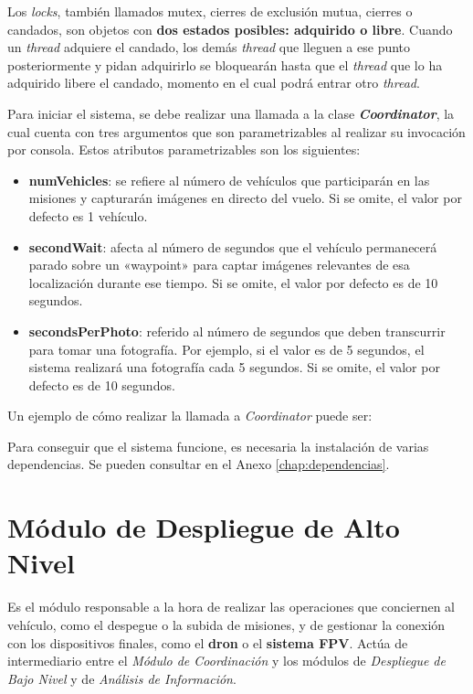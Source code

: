 Los \textit{locks}, también llamados mutex, cierres de exclusión mutua, cierres o candados, son objetos con \textbf{dos estados posibles: adquirido o libre}. Cuando un \textit{thread} adquiere el candado, los demás \textit{thread} que lleguen a ese punto posteriormente y pidan adquirirlo se bloquearán hasta que el \textit{thread} que lo ha adquirido libere el candado, momento en el cual podrá entrar otro \textit{thread}.

Para iniciar el sistema, se debe realizar una llamada a la clase \textbf{\textit{Coordinator}}, la cual cuenta con tres argumentos que son parametrizables al realizar su invocación por consola. Estos atributos parametrizables son los siguientes:
\begin{itemize}
\item \textbf{numVehicles}: se refiere al número de vehículos que participarán en las misiones y capturarán imágenes en directo del vuelo. Si se omite, el valor por defecto es 1 vehículo.
\item \textbf{secondWait}: afecta al número de segundos que el vehículo permanecerá parado sobre un «waypoint» para captar imágenes relevantes de esa localización durante ese tiempo. Si se omite, el valor por defecto es de 10 segundos.
\item \textbf{secondsPerPhoto}: referido al número de segundos que deben transcurrir para tomar una fotografía. Por ejemplo, si el valor es de 5 segundos, el sistema realizará una fotografía cada 5 segundos. Si se omite, el valor por defecto es de 10 segundos.
\end{itemize} 

Un ejemplo de cómo realizar la llamada a \textit{Coordinator} puede ser:


Para conseguir que el sistema funcione, es necesaria la instalación de varias dependencias. Se pueden consultar en el Anexo \ref{chap:dependencias}.

\section{Módulo de Despliegue de Alto Nivel}

Es el módulo responsable a la hora de realizar las operaciones que conciernen al vehículo, como el despegue o la subida de misiones, y de gestionar la conexión con los dispositivos finales, como el \textbf{dron} o el \textbf{sistema \acs{FPV}}. Actúa de intermediario entre el \textit{Módulo de Coordinación} y los módulos de \textit{Despliegue de Bajo Nivel} y de \textit{Análisis de Información}.
